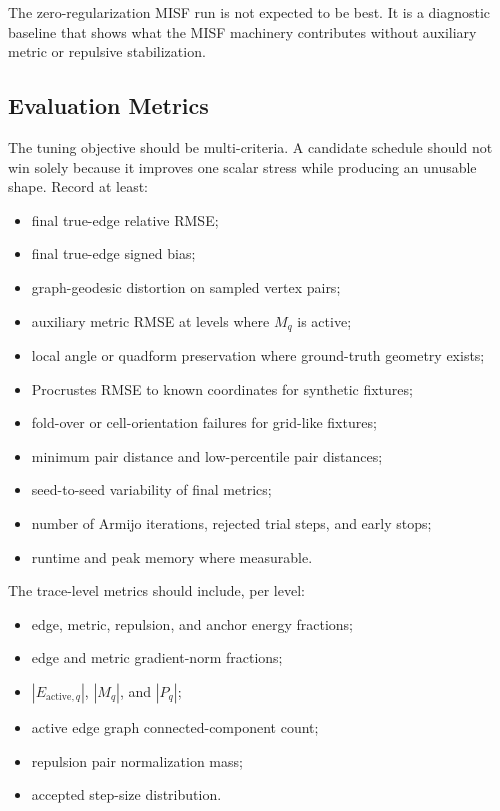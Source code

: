 \documentclass[11pt]{article}
\begin{document}
The zero-regularization MISF run is not expected to be best. It is a diagnostic
baseline that shows what the MISF machinery contributes without auxiliary
metric or repulsive stabilization.

\subsection{Evaluation Metrics}

The tuning objective should be multi-criteria. A candidate schedule should not
win solely because it improves one scalar stress while producing an unusable
shape. Record at least:
\begin{itemize}[leftmargin=2em]
  \item final true-edge relative RMSE;
  \item final true-edge signed bias;
  \item graph-geodesic distortion on sampled vertex pairs;
  \item auxiliary metric RMSE at levels where \(M_q\) is active;
  \item local angle or quadform preservation where ground-truth geometry exists;
  \item Procrustes RMSE to known coordinates for synthetic fixtures;
  \item fold-over or cell-orientation failures for grid-like fixtures;
  \item minimum pair distance and low-percentile pair distances;
  \item seed-to-seed variability of final metrics;
  \item number of Armijo iterations, rejected trial steps, and early stops;
  \item runtime and peak memory where measurable.
\end{itemize}

The trace-level metrics should include, per level:
\begin{itemize}[leftmargin=2em]
  \item edge, metric, repulsion, and anchor energy fractions;
  \item edge and metric gradient-norm fractions;
  \item \(|E_{\mathrm{active},q}|\), \(|M_q|\), and \(|P_q|\);
  \item active edge graph connected-component count;
  \item repulsion pair normalization mass;
  \item accepted step-size distribution.
\end{itemize}
\end{document}
